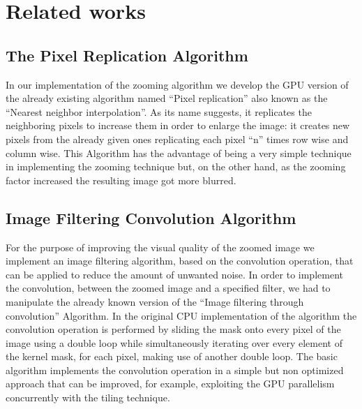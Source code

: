 \section{Related works}

    \subsection{The Pixel Replication Algorithm}
    In our implementation of the zooming algorithm we develop the GPU version of the already existing algorithm named “Pixel replication” also known as the “Nearest neighbor interpolation”.
    As its name suggests, it replicates the neighboring pixels to increase them in order to enlarge the image: it creates new pixels from the already given ones replicating each pixel “n” times row wise and column wise.
    This Algorithm has the advantage of being a very simple technique in implementing the zooming technique but, on the other hand, as the zooming factor increased the resulting image got more blurred.


    \subsection{Image Filtering Convolution Algorithm}
    For the purpose of improving the visual quality of the zoomed image we implement an image filtering algorithm, based on the convolution operation,  that can be applied to reduce the amount of unwanted noise. 
    In order to implement the convolution, between the zoomed image and a specified filter, we had to manipulate the already known version of the “Image filtering through convolution” Algorithm.
    In the original CPU implementation of the algorithm the convolution operation is performed by sliding the mask onto every pixel of the image using a double loop while simultaneously iterating over every element of the kernel mask, for each pixel, making use of another double loop.
    The basic algorithm implements the convolution operation in a simple but non optimized approach that can be improved, for example, exploiting the GPU parallelism concurrently with the tiling technique. 
